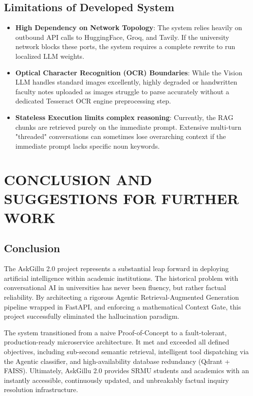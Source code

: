 \documentclass[12pt,a4paper]{report}
\begin{document}
\section{Limitations of Developed System}
\begin{itemize}
    \item \textbf{High Dependency on Network Topology}: The system relies heavily on outbound API calls to HuggingFace, Groq, and Tavily. If the university network blocks these ports, the system requires a complete rewrite to run localized LLM weights.
    \item \textbf{Optical Character Recognition (OCR) Boundaries}: While the Vision LLM handles standard images excellently, highly degraded or handwritten faculty notes uploaded as images struggle to parse accurately without a dedicated Tesseract OCR engine preprocessing step.
    \item \textbf{Stateless Execution limits complex reasoning}: Currently, the RAG chunks are retrieved purely on the immediate prompt. Extensive multi-turn "threaded" conversations can sometimes lose overarching context if the immediate prompt lacks specific noun keywords.
\end{itemize}

\chapter{CONCLUSION AND SUGGESTIONS FOR FURTHER WORK}

\section{Conclusion}
The AskGillu 2.0 project represents a substantial leap forward in deploying artificial intelligence within academic institutions. The historical problem with conversational AI in universities has never been fluency, but rather factual reliability. By architecting a rigorous Agentic Retrieval-Augmented Generation pipeline wrapped in FastAPI, and enforcing a mathematical Context Gate, this project successfully eliminated the hallucination paradigm.

The system transitioned from a naive Proof-of-Concept to a fault-tolerant, production-ready microservice architecture. It met and exceeded all defined objectives, including sub-second semantic retrieval, intelligent tool dispatching via the Agentic classifier, and high-availability database redundancy (Qdrant + FAISS). Ultimately, AskGillu 2.0 provides SRMU students and academics with an instantly accessible, continuously updated, and unbreakably factual inquiry resolution infrastructure.
\end{document}
